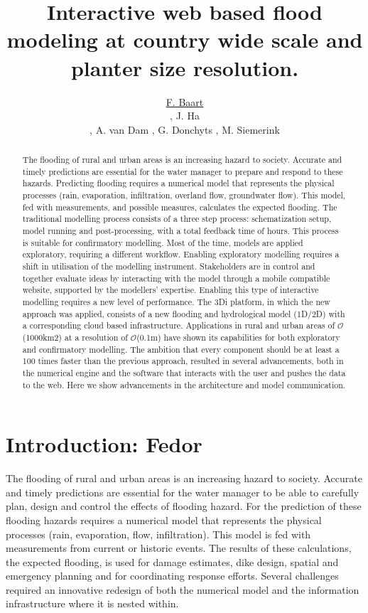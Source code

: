 \documentclass[a4paper]{article}
\title{Interactive web based flood modeling at country wide scale and planter size resolution.}
\author{\underline{F. Baart}
  \address[A1]{\it{Deltares,
      Rotterdamseweg
      Delft, The Netherlands (fedor.baart@deltares.nl, arthur.vandam@deltares.nl, gennadii.donchyts@deltares.nl)}},
  J. Ha
  \address[B1]{\it{Nelen \& Schuurmans,
      Zakkendragerssteeg,
      Utrecht, The Netherlands (jack.ha@nelen-schuurmans.nl, martijn.siemerink@nelen-schuurmans.nl)}},
  A. van Dam \addressmark[A1],
  G. Donchyts \addressmark[A1],
  M. Siemerink \addressmark[B1]
}
\DeclareRobustCommand{\orderof}{\ensuremath{\mathcal{O}}}
\DeclareRobustCommand{\threedi}{3Di }
\begin{document}
\begin{abstract}
  The flooding of rural and urban areas is an increasing hazard to society. Accurate and timely predictions are essential for the water manager to prepare and respond to these hazards.
  Predicting flooding requires a numerical model that represents the physical processes (rain, evaporation, infiltration, overland flow, groundwater flow). This model, fed with measurements, and possible measures, calculates the expected flooding.
  The traditional modelling process consists of a three step process: schematization setup, model running and post-processing, with a total feedback time of hours.  This process is suitable for confirmatory modelling. Most of the time, models are applied exploratory, requiring a different workflow.
  Enabling exploratory modelling requires a shift in utilisation of the modelling instrument. Stakeholders are in control and together evaluate ideas by interacting with the model through a mobile compatible website, supported by the modellers’ expertise. Enabling this type of interactive modelling requires a new level of performance.
  The \threedi platform, in which the new approach was applied, consists of a new flooding and hydrological model (1D/2D) with a corresponding cloud based infrastructure. Applications in rural and urban areas of \orderof(1000km2) at a resolution of \orderof(0.1m) have shown its capabilities for both exploratory and confirmatory modelling.
  The ambition that every component should be at least a 100 times faster than the previous approach, resulted in several advancements, both in the numerical engine and the software that interacts with the user and pushes the data to the web. Here we show advancements in the architecture and model communication.

\end{abstract}
\begin{keyword}
\end{keyword}

\maketitle


\section{Introduction: Fedor}

The flooding of rural and urban areas is an increasing hazard to society. Accurate and timely predictions are essential for the water manager to be able to carefully plan, design and control the effects of flooding hazard.
For the prediction of these flooding hazards requires a numerical model that represents the physical processes (rain, evaporation, flow, infiltration). This model is fed with measurements from current or historic events. The results of these calculations, the expected flooding, is used for damage estimates, dike design, spatial and emergency planning and for coordinating response efforts. Several challenges required an innovative redesign of both the numerical model and the information infrastructure where it is nested within.
\end{document}
